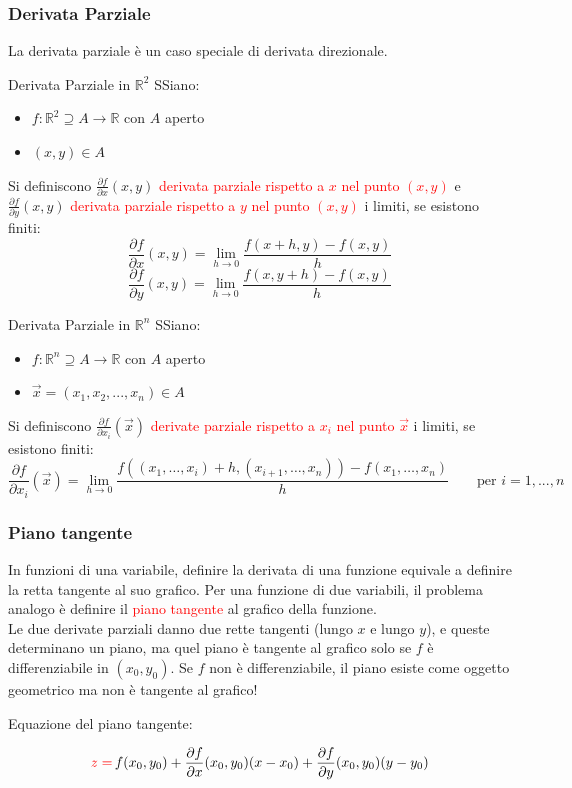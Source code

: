 \documentclass{article}  %
\begin{document}
\subsubsection{Derivata Parziale}
La derivata parziale è un caso speciale di derivata direzionale.
\begin{definition}{Derivata Parziale in $\mathbb{R}^2$}
	SSiano: \begin{itemize}
		\item $f: \mathbb{R}^2 \supseteq A \to \mathbb{R}$ con $A$ aperto
		\item $(x,y) \in A$
	\end{itemize}
	Si definiscono $\frac{\partial f}{\partial x}(x,y)$ \textcolor{red}{derivata parziale rispetto a $x$ nel punto $(x,y)$} e
	$\frac{\partial f}{\partial y}(x,y)$ \textcolor{red}{derivata parziale rispetto a $y$ nel punto $(x,y)$} i limiti, se esistono finiti:
	\[
		\frac{\partial f}{\partial x}(x,y)=\lim_{h \to 0}\frac{f(x+h,y)-f(x,y)}{h}
	\]
	\[
		\frac{\partial f}{\partial y}(x,y)=\lim_{h \to 0}\frac{f(x,y+h)-f(x,y)}{h}
	\]
\end{definition}

\begin{definition}{Derivata Parziale in $\mathbb{R}^n$}
	SSiano: \begin{itemize}
		\item $f: \mathbb{R}^n \supseteq A \to \mathbb{R}$ con $A$ aperto
		\item $\vec{x}=(x_1,x_2,...,x_n) \in A$
	\end{itemize}
	Si definiscono $\frac{\partial f}{\partial x_i}(\vec{x})$ \textcolor{red}{derivate parziale rispetto a $x_i$ nel punto $\vec{x}$} i limiti, se esistono finiti:
	\[
		\frac{\partial f}{\partial x_i}(\vec{x})=\lim_{h \to 0}\frac{f((x_1,\dots,x_i)+h, (x_{i+1},\dots,x_n))-f(x_1,\dots,x_n)}{h} \quad \quad \text{per } i=1,...,n
	\]
\end{definition}
\subsubsection{Piano tangente}
In funzioni di una variabile, definire la derivata di una funzione equivale a definire la retta tangente al suo grafico. Per una funzione di due variabili,
il problema analogo è definire il \textcolor{red}{piano tangente} al grafico della funzione.  \\ Le due derivate parziali danno due rette tangenti (lungo $x$ e lungo $y$),
e queste determinano un piano, ma quel piano è tangente al grafico solo se $f$ è differenziabile in $(x_0,y_0)$.
Se $f$ non è differenziabile, il piano esiste come oggetto geometrico ma non è tangente al grafico!
\begin{center}
	Equazione del piano tangente:
\end{center}
\[
	\textcolor{red}{z=\,}f(x_0,y_0)+\frac{\partial f}{\partial x}(x_0,y_0)(x-x_0)+\frac{\partial f}{\partial y}(x_0,y_0)(y-y_0)
\]
\end{document}
